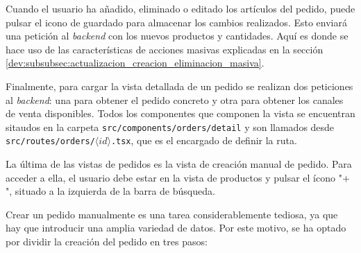 Cuando el usuario ha añadido, eliminado o editado los artículos del pedido, puede pulsar el icono de guardado para almacenar los cambios realizados. Esto enviará una petición al \textit{backend} con los nuevos productos y cantidades. Aquí es donde se hace uso de las características de acciones masivas explicadas en la sección \ref{dev:subsubsec:actualizacion_creacion_eliminacion_masiva}.

Finalmente, para cargar la vista detallada de un pedido se realizan dos peticiones al \textit{backend}: una para obtener el pedido concreto y otra para obtener los canales de venta disponibles. Todos los componentes que componen la vista se encuentran sitaudos en la carpeta \texttt{src/components/orders/detail} y son llamados desde \texttt{src/routes/orders/$\langle id \rangle$.tsx}, que es el encargado de definir la ruta.

La última de las vistas de pedidos es la vista de creación manual de pedido. Para acceder a ella, el usuario debe estar en la vista de productos y pulsar el ícono "$+$", situado a la izquierda de la barra de búsqueda.

Crear un pedido manualmente es una tarea considerablemente tediosa, ya que hay que introducir una amplia variedad de datos. Por este motivo, se ha optado por dividir la creación del pedido en tres pasos:

